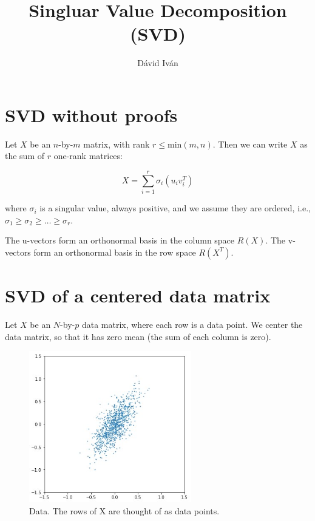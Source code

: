 \documentclass{article}
\title{Singluar Value Decomposition (SVD)}
\author{Dávid Iván}
\begin{document}
\maketitle

\tableofcontents

\newpage

\section{SVD without proofs}

Let $X$ be an $n$-by-$m$ matrix, with rank $r \le \text{min}(m,n)$. Then we can write $X$ as the sum of $r$ one-rank matrices:

\begin{equation}
    X = \sum_{i=1}^r \sigma_i (u_iv^T_i)
\end{equation}

where $\sigma_i$ is a singular value, always positive, and we assume they are ordered, i.e., $\sigma_1 \ge \sigma_2 \ge \dots \ge \sigma_r$.

The u-vectors form an orthonormal basis in the column space $R(X)$. The v-vectors form an orthonormal basis in the row space $R(X^T)$.

\section{SVD of a centered data matrix}

Let $X$ be an $N$-by-$p$ data matrix, where each row is a data point. We center the data matrix, so that it has zero mean (the sum of each column is zero).

\begin{figure}[ht]
 \centering
  \includegraphics[width=200pt]{images/data_matrix.jpg}
 \caption{Data. The rows of X are thought of as data points.}
\end{figure}
\end{document}

